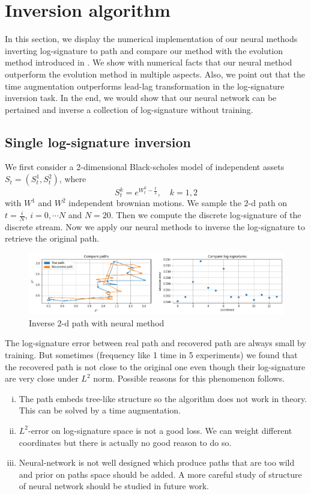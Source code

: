 \documentclass[12pt]{report}
\theoremstyle{definition}
\theoremstyle{remark}
\begin{document}
\section{Inversion algorithm}
In this section, we display the numerical implementation of our neural methods inverting log-signature to path and compare our method with the evolution method introduced in \cite{buehler2020data}. We show with numerical facts that our neural method outperform the evolution method in multiple aspects. Also, we point out that the time augmentation outperforms lead-lag transformation in the log-signature inversion task. In the end, we would show that our neural network can be pertained and inverse a collection of log-signature without training.
\subsection{Single log-signature inversion}
We first consider a 2-dimensional Black-scholes model of independent assets $S_{t} = (S^{1}_{t}, S^{2}_{t})$, where
\begin{equation*}
  S^{k}_{t} = e^{W^{k}_{t} - \frac{t}{2}},\quad k = 1,2
\end{equation*}
with $W^{1}$ and $W^{2}$ independent brownian motions. We sample the $2$-d path on $t = \frac{i}{N}$, $i = 0,\cdots N$ and $N = 20$. Then we compute the discrete log-signature of the discrete stream. Now we apply our neural methods to inverse the log-signature to retrieve the original path.
 \begin{figure}[H]
    \centering
    \includegraphics[width=\textwidth]{figs/inverse2.png}
    \caption{Inverse 2-d path with neural method}
\end{figure}
The log-signature error between real path and recovered path are always small by training. But sometimes (frequency like 1 time in 5 experiments) we found that the recovered path is not close to the original one even though their log-signature are very close under $L^{2}$ norm. Possible reasons for this phenomenon follows.
\begin{enumerate}[(i)]
  \item The path embeds tree-like structure so the algorithm does not work in theory. This can be solved by a time augmentation. 
  \item $L^{2}$-error on log-signature space is not a good loss. We can weight different coordinates but there is actually no good reason to do so.
  \item Neural-network is not well designed which produce paths that are too wild and prior on paths space should be added. A more careful study of structure of neural network should be studied in future work.
\end{enumerate}
\end{document}
